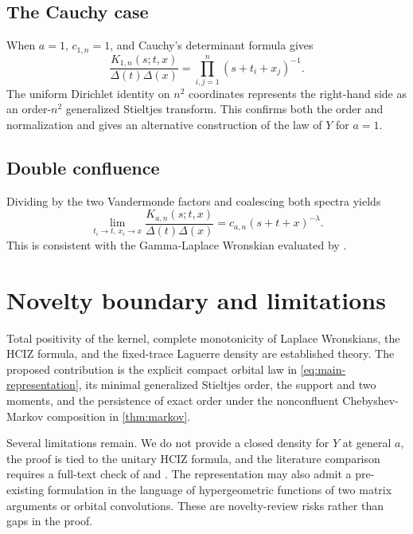\documentclass[11pt]{article}
\theoremstyle{definition}
\theoremstyle{remark}
\begin{document}
\subsection{The Cauchy case}

When $a=1$, $c_{1,n}=1$, and Cauchy's determinant formula gives
\begin{equation}\label{eq:cauchy-case}
\frac{K_{1,n}(s;t,x)}{\Delta(t)\Delta(x)}
=\prod_{i,j=1}^{n}(s+t_i+x_j)^{-1}.
\end{equation}
The uniform Dirichlet identity on $n^2$ coordinates represents the right-hand
side as an order-$n^2$ generalized Stieltjes transform. This confirms both the
order and normalization and gives an alternative construction of the law of
$Y$ for $a=1$.

\subsection{Double confluence}

Dividing by the two Vandermonde factors and coalescing both spectra yields
\begin{equation}\label{eq:double-confluence}
\lim_{t_i\to t,\,x_i\to x}
\frac{K_{a,n}(s;t,x)}{\Delta(t)\Delta(x)}
=c_{a,n}(s+t+x)^{-\lambda}.
\end{equation}
This is consistent with the Gamma-Laplace Wronskian evaluated by
\citet[Proposition~2.10]{DimitrovXu2019}.

\section{Novelty boundary and limitations}

Total positivity of the kernel, complete monotonicity of Laplace Wronskians,
the HCIZ formula, and the fixed-trace Laguerre density are established theory.
The proposed contribution is the explicit compact orbital law in
\eqref{eq:main-representation}, its minimal generalized Stieltjes order, the
support and two moments, and the persistence of exact order under the
nonconfluent Chebyshev-Markov composition in \cref{thm:markov}.

Several limitations remain. We do not provide a closed density for $Y$ at
general $a$, the proof is tied to the unitary HCIZ formula, and the literature
comparison requires a full-text check of \citet{GrossRichards1989} and
\citet{DetteMunk1996}. The representation may also admit a pre-existing
formulation in the language of hypergeometric functions of two matrix
arguments or orbital convolutions. These are novelty-review risks rather than
gaps in the proof.



\end{document}
